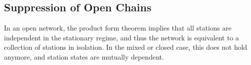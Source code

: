 %
%
%
%
%
%
\subsection{Suppression of Open Chains} In an
open network, the product form theorem implies
that all stations are independent in the
stationary regime, and thus the network is
equivalent to a collection of stations in
isolation. In the mixed or closed case, this does
not hold anymore, and station states are mutually
dependent.

